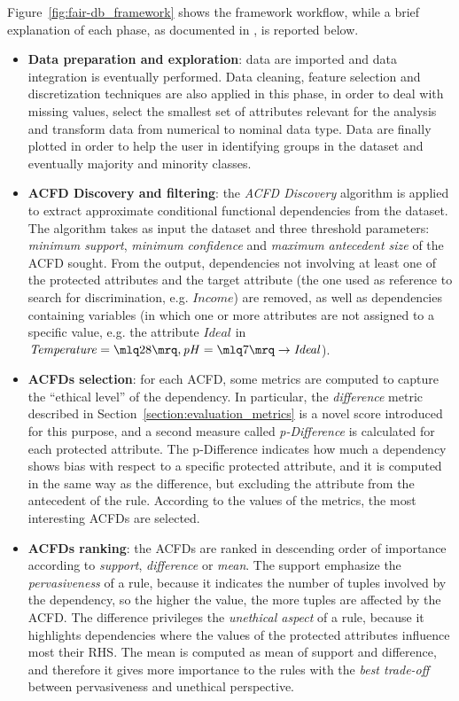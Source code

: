 Figure~\ref{fig:fair-db_framework} shows the framework workflow, while a brief explanation of each phase, as documented in \cite{azzalini2021fair}, is reported below.
\begin{itemize}
\item \textbf{Data preparation and exploration}: data are imported and data integration is eventually performed. Data cleaning, feature selection and discretization techniques are also applied in this phase, in order to deal with missing values, select the smallest set of attributes relevant for the analysis and transform data from numerical to nominal data type. Data are finally plotted in order to help the user in identifying groups in the dataset and eventually majority and minority classes.
\item \textbf{ACFD Discovery and filtering}: the \textit{ACFD Discovery} algorithm is applied to extract approximate conditional functional dependencies from the dataset. The algorithm takes as input the dataset and three threshold parameters: \textit{minimum support}, \textit{minimum confidence} and \textit{maximum antecedent size} of the ACFD sought. From the output, dependencies not involving at least one of the protected attributes and the target attribute (the one used as reference to search for discrimination, e.g. \(\mathit{Income}\)) are removed, as well as dependencies containing variables (in which one or more attributes are not assigned to a specific value, e.g. the attribute \(\mathit{Ideal}\) in \(\mathit{Temperature} = \mlq 28 \mrq, \mathit{pH} = \mlq 7 \mrq \rightarrow \mathit{Ideal}\)).
\item \textbf{ACFDs selection}: for each ACFD, some metrics are computed to capture the ``ethical level'' of the dependency. In particular, the \textit{difference} metric described in Section~\ref{section:evaluation_metrics} is a novel score introduced for this purpose, and a second measure called \textit{p-Difference} is calculated for each protected attribute. The p-Difference indicates how much a dependency shows bias with respect to a specific protected attribute, and it is computed in the same way as the difference, but excluding the attribute from the antecedent of the rule. According to the values of the metrics, the most interesting ACFDs are selected.
\item \textbf{ACFDs ranking}: the ACFDs are ranked in descending order of importance according to \textit{support}, \textit{difference} or \textit{mean}. The support emphasize the \textit{pervasiveness} of a rule, because it indicates the number of tuples involved by the dependency, so the higher the value, the more tuples are affected by the ACFD. The difference privileges the \textit{unethical aspect} of a rule, because it highlights dependencies where the values of the protected attributes influence most their RHS. The mean is computed as mean of support and difference, and therefore it gives more importance to the rules with the \textit{best trade-off} between pervasiveness and unethical perspective.

\end{itemize}
